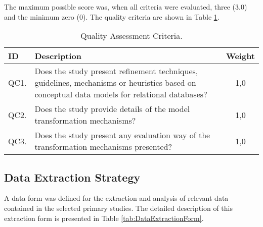 The maximum possible score was, when all criteria were evaluated, three (3.0) and the minimum zero (0).
The quality criteria are shown in Table \ref{tab:CAQ}.

\begin{table}[!htb]
    \centering
    \footnotesize
    \caption{Quality Assessment Criteria.}
    \label{tab:CAQ}
    \begin{tabular}{l|p{12cm}|c}
    \bottomrule
    \rowcolor[HTML]{C0C0C0}
    \textbf{ID} & \textbf{Description} & \textbf{Weight} 
    \\ 
    \hline
    QC1. & Does the study present refinement techniques, guidelines, mechanisms or heuristics based on conceptual data models for relational databases? & 1,0 
    \\
    QC2. & Does the study provide details of the model transformation mechanisms? & 1,0 
    \\
    QC3. & Does the study present any evaluation way of the transformation mechanisms presented? & 1,0 
    \\
    \toprule
    \end{tabular}
\end{table}

\subsection{Data Extraction Strategy} \label{ssec_slm:dataExtraction}

A data form was defined for the extraction and analysis of relevant data contained in the selected primary studies.
The detailed description of this extraction form is presented in Table \ref{tab:DataExtractionForm}.

